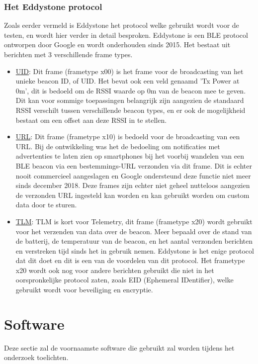 \subsubsection{Het Eddystone protocol}
Zoals eerder vermeld is Eddystone het protocol welke gebruikt wordt voor de testen, en wordt hier verder in detail besproken. Eddystone is een BLE protocol ontworpen door Google en wordt onderhouden sinds 2015. Het bestaat uit berichten met 3 verschillende frame types. 
\begin{itemize}
	\item \underline{UID}:
	Dit frame (frametype x00) is het frame voor de broadcasting van het unieke beacon ID, of UID. Het bevat ook een veld genaamd 'Tx Power at 0m', dit is bedoeld om de RSSI waarde op 0m van de beacon mee te geven. Dit kan voor sommige toepassingen belangrijk zijn aangezien de standaard RSSI verschilt tussen verschillende beacon types, en er ook de mogelijkheid bestaat om een offset aan deze RSSI in te stellen.
	\item \underline{URL}:
	Dit frame (frametype x10) is bedoeld voor de broadcasting van een URL. Bij de ontwikkeling was het de bedoeling om notificaties met advertenties te laten zien op smartphones bij het voorbij wandelen van een BLE beacon via een bestemmings-URL verzonden via dit frame. Dit is echter nooit commercieel aangeslagen en Google ondersteund deze functie niet meer sinds december 2018.\autocite{Estimote2018} Deze frames zijn echter niet geheel nutteloos aangezien de verzonden URL ingesteld kan worden en kan gebruikt worden om custom data door te sturen.
	\item \underline{TLM}:
	TLM is kort voor Telemetry, dit frame (frametype x20) wordt gebruikt voor het verzenden van data over de beacon. Meer bepaald over de stand van de batterij, de temperatuur van de beacon, en het aantal verzonden berichten en verstreken tijd sinds het in gebruik nemen. Eddystone is het enige protocol dat dit doet en dit is een van de voordelen van dit protocol. Het frametype x20 wordt ook nog voor andere berichten gebruikt die niet in het oorspronkelijke protocol zaten, zoals EID (Ephemeral IDentifier), welke gebruikt wordt voor beveiliging en encryptie.
\end{itemize}\autocite{Google2018}

\section{Software}
\label{sec:lit-software}
Deze sectie zal de voornaamste software die gebruikt zal worden tijdens het onderzoek toelichten.

